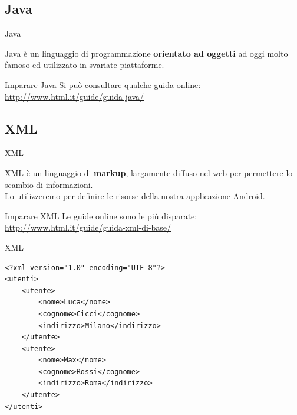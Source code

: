 \documentclass[xcolor=svgnames,11pt]{beamer}
\begin{document}
\subsection{Java}
\begin{frame}{Java}

Java \`e un linguaggio di programmazione \textbf{orientato ad oggetti} ad oggi molto famoso ed utilizzato in svariate piattaforme.
\pause
\begin{center}
\end{center}
\pause
\begin{block}{Imparare Java}
Si pu\`o consultare qualche guida online: \url{ http://www.html.it/guide/guida-java/}
\end{block}

\end{frame}

\subsection{XML}
\begin{frame}{XML}

XML \`e un linguaggio di \textbf{markup}, largamente diffuso nel web per permettere lo scambio di informazioni.\\
\pause
\medskip
Lo utilizzeremo per definire le risorse della nostra applicazione Android.\\
\medskip
\pause
\begin{block}{Imparare XML}
Le guide online sono le pi\`u disparate: \url{http://www.html.it/guide/guida-xml-di-base/}
\end{block}

\end{frame}

\begin{frame}[fragile]{XML}

\begin{lstlisting}
<?xml version="1.0" encoding="UTF-8"?>
<utenti>
    <utente>
        <nome>Luca</nome>
        <cognome>Cicci</cognome>
        <indirizzo>Milano</indirizzo>
    </utente>
    <utente>
        <nome>Max</nome>
        <cognome>Rossi</cognome>
        <indirizzo>Roma</indirizzo>
    </utente>
</utenti>
\end{lstlisting}

\end{frame}
\end{document}

